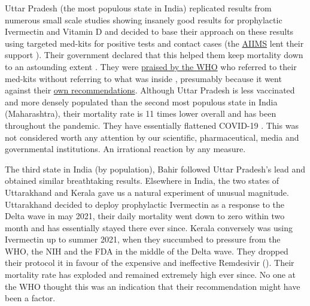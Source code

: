 \documentclass[11pt,a4paper]{article}
\begin{document}
Uttar Pradesh (the most populous state in India) replicated results from numerous small scale studies showing insanely good results for prophylactic Ivermectin and Vitamin D and decided to base their approach on these results using targeted med-kits for positive tests and contact cases (the \href{https://www.aiims.edu/en.html}{AIIMS} lent their support \cite{Behera2021-qu}). Their government declared that this helped them keep mortality down to an astounding extent \cite{indianexpress12052021}. They were \href{https://www.who.int/india/news/feature-stories/detail/uttar-pradesh-going-the-last-mile-to-stop-covid-19}{praised by the WHO} who referred to their med-kits without referring to what was inside \cite{medicalupdateonline21052021} \cite{hindu14092020}, presumably because it went against their \href{https://www.who.int/news-room/feature-stories/detail/who-advises-that-ivermectin-only-be-used-to-treat-covid-19-within-clinical-trials}{own recommendations}. Although Uttar Pradesh is less vaccinated and more densely populated than the second most populous state in India (Maharashtra), their mortality rate is 11 times lower overall and has been throughout the pandemic. They have essentially flattened COVID-19 \cite{hindustantimes19092021}. This was not considered worth any attention by our scientific, pharmaceutical, media and governmental institutions. An irrational reaction by any measure.

The third state in India (by population), Bahir followed Uttar Pradesh’s lead and obtained similar breathtaking results. Elsewhere in India, the two states of Uttarakhand and Kerala gave us a natural experiment of unusual magnitude. Uttarakhand decided to deploy prophylactic Ivermectin as a response to the Delta wave in may 2021, their daily mortality went down to zero within two month and has essentially stayed there ever since. Kerala conversely was using Ivermectin up to summer 2021, when they succumbed to pressure from the WHO, the NIH and the FDA in the middle of the Delta wave. They dropped their protocol it in favour of the expensive and ineffective Remdesivir (\cite{Bose2021-xv}). Their mortality rate has exploded and remained extremely high ever since. No one at the WHO thought this was an indication that their recommendation might have been a factor.   
\end{document}
